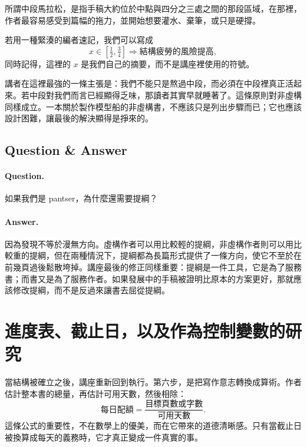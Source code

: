 \begin{definition}
所謂中段馬拉松，是指手稿大約位於中點與四分之三處之間的那段區域，在那裡，作者最容易感受到篇幅的拖力，並開始想要灌水、棄筆，或只是硬撐。
\end{definition}

若用一種緊湊的編者速記，我們可以寫成
\begin{equation}
x \in \left[\tfrac12,\tfrac34\right] \Rightarrow \text{結構疲勞的風險提高},
\end{equation}
同時記得，這裡的 \(x\) 是我們自己的摘要，而不是講座裡使用的符號。

講者在這裡最強的一條主張是：我們不能只是熬過中段，而必須在中段裡真正活起來。若中段對我們而言已經顯得乏味，那讀者其實早就睡著了。這條原則對非虛構同樣成立。一本關於製作模型船的非虛構書，不應該只是列出步驟而已；它也應該設計困難，讓最後的解決顯得是掙來的。

\subsection{Question \& Answer}

\paragraph{Question.} 如果我們是 pantser，為什麼還需要提綱？

\paragraph{Answer.} 因為發現不等於漫無方向。虛構作者可以用比較輕的提綱，非虛構作者則可以用比較重的提綱，但在兩種情況下，提綱都為長篇形式提供了一條方向，使它不至於在前幾頁過後鬆散垮掉。講座最後的修正同樣重要：提綱是一件工具，它是為了服務書；而書又是為了服務作者。如果發展中的手稿被證明比原本的方案更好，那就應該修改提綱，而不是反過來讓書去屈從提綱。

\section{進度表、截止日，以及作為控制變數的研究}

當結構被確立之後，講座重新回到執行。第六步，是把寫作意志轉換成算術。作者估計整本書的總量，再估計可用天數，然後相除：
\begin{equation}
\text{每日配額} = \frac{\text{目標頁數或字數}}{\text{可用天數}}.
\end{equation}
這條公式的重要性，不在數學上的優美，而在它帶來的道德清晰感。只有當截止日被換算成每天的義務時，它才真正變成一件真實的事。

